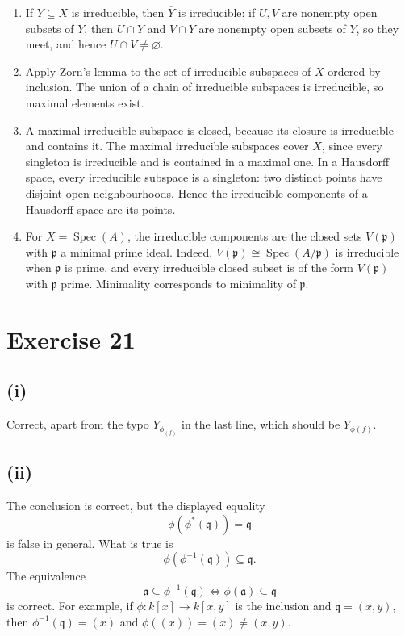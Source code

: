 \documentclass[11pt]{article}
\DeclareMathOperator{\Spec}{Spec}
\newcommand{\fp}{\mathfrak p}
\newcommand{\fa}{\mathfrak a}
\newcommand{\fq}{\mathfrak q}
\begin{document}
\begin{enumerate}[label=(\roman*)]
  \item If \(Y\subseteq X\) is irreducible, then \(\overline Y\) is
        irreducible: if \(U,V\) are nonempty open subsets of \(\overline Y\),
        then \(U\cap Y\) and \(V\cap Y\) are nonempty open subsets of \(Y\),
        so they meet, and hence \(U\cap V\neq\varnothing\).

  \item Apply Zorn's lemma to the set of irreducible subspaces of \(X\)
        ordered by inclusion.  The union of a chain of irreducible subspaces
        is irreducible, so maximal elements exist.

  \item A maximal irreducible subspace is closed, because its closure is
        irreducible and contains it.  The maximal irreducible subspaces cover
        \(X\), since every singleton is irreducible and is contained in a
        maximal one.  In a Hausdorff space, every irreducible subspace is a
        singleton: two distinct points have disjoint open neighbourhoods.
        Hence the irreducible components of a Hausdorff space are its
        points.

  \item For \(X=\Spec(A)\), the irreducible components are the closed sets
        \(V(\fp)\) with \(\fp\) a minimal prime ideal.  Indeed,
        \(V(\fp)\cong\Spec(A/\fp)\) is irreducible when \(\fp\) is prime, and
        every irreducible closed subset is of the form \(V(\fp)\) with
        \(\fp\) prime.  Minimality corresponds to minimality of \(\fp\).
\end{enumerate}

\section*{Exercise 21}

\subsection*{(i)}
Correct, apart from the typo \(Y_{\phi_{(f)}}\) in the last line, which should
be \(Y_{\phi(f)}\).

\subsection*{(ii)}
The conclusion is correct, but the displayed equality
\[
\phi(\phi^*(\fq))=\fq
\]
is false in general.  What is true is
\[
\phi(\phi^{-1}(\fq))\subseteq\fq.
\]
The equivalence
\[
\fa\subseteq\phi^{-1}(\fq)\iff\phi(\fa)\subseteq\fq
\]
is correct.  For example, if \(\phi:k[x]\to k[x,y]\) is the inclusion and
\(\fq=(x,y)\), then \(\phi^{-1}(\fq)=(x)\) and
\(\phi((x))=(x)\neq(x,y)\).
\end{document}
